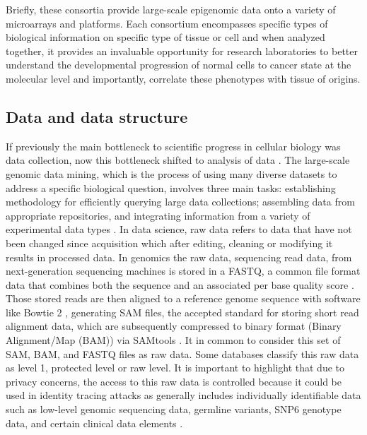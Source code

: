 Briefly, these consortia provide large-scale epigenomic data onto a variety of microarrays and  platforms. Each consortium encompasses specific types of biological information on specific type of tissue or cell and when analyzed together, it provides an invaluable opportunity for research laboratories to better understand the developmental progression of normal cells to cancer state at the molecular level and importantly, correlate these phenotypes with tissue of origins.

\subsection{Data and data structure} \label{susec:structure}

If previously the main bottleneck to scientific progress in cellular biology was data collection, now this
 bottleneck shifted to analysis of data \cite{mcpherson2009next}.
 The large-scale genomic data mining, which is the process of using many diverse datasets to address a specific biological question, involves three main tasks: establishing methodology for efficiently querying large data collections; assembling data from appropriate repositories, and integrating information from a variety of experimental data types \cite{huttenhower2010quick}.
In data science, raw data refers to data that have not been changed since acquisition which after editing, cleaning or modifying it results in processed data. In genomics the raw data, sequencing read data,
 from next-generation sequencing machines is stored in a FASTQ,
 a common file format data that combines both the sequence and an associated per base quality score \cite{cock2009sanger}.
 Those stored reads are then aligned to a reference genome sequence with software like Bowtie 2 \cite{langmead2012fast},
generating SAM files, the accepted standard for storing short read alignment data, which are subsequently compressed to binary  format (Binary Alignment/Map (BAM)) via SAMtools \cite{li2009sequence}. It in common to consider this set of SAM, BAM, and FASTQ files as raw data. Some databases classify this raw data as level 1, protected level or raw level.
It is important to highlight that due to privacy concerns, the access to this raw data is controlled
because it could be used in identity tracing attacks \cite{erlich2014routes,ayday2014privacy} as
generally includes individually identifiable data such as low-level genomic sequencing data, germline variants, SNP6 genotype data, and certain clinical data elements \cite{GDC_data}.
